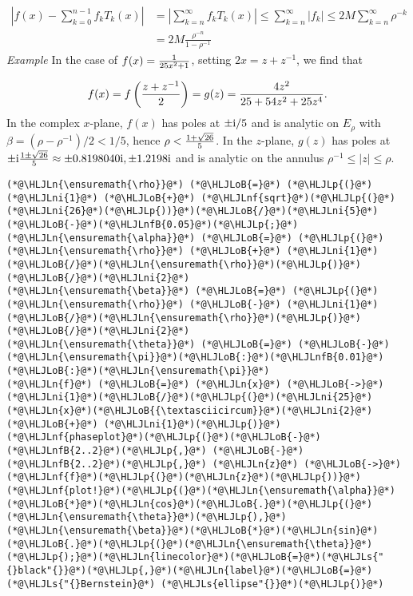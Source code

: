 \documentclass[12pt,a4paper]{article}
\newcommand{\HLJLn}[1]{#1}
\newcommand{\HLJLnf}[1]{\textcolor[RGB]{66,102,213}{#1}}
\newcommand{\HLJLs}[1]{\textcolor[RGB]{201,61,57}{#1}}
\newcommand{\HLJLnfB}[1]{\textcolor[RGB]{59,151,46}{#1}}
\newcommand{\HLJLni}[1]{\textcolor[RGB]{59,151,46}{#1}}
\newcommand{\HLJLoB}[1]{\textcolor[RGB]{102,102,102}{\textbf{#1}}}
\newcommand{\HLJLp}[1]{#1}
\def\I{ {\rm i} }
\begin{document}
\begin{align*}
\left \vert f(x) -   \sum_{k = 0}^{n-1}f_kT_k(x) \right\vert & = \left \vert  \sum_{k = n}^{\infty}f_kT_k(x) \right\vert \leq \sum_{k = n}^{\infty}\vert f_k \vert \leq 2M \sum_{k = n}^{\infty} \rho^{-k}\\
& = 2M \frac{\rho^{-n}}{1 - \rho^{-1}}
\end{align*}
\emph{Example}  In the case of $f(x) = {1 \over 25 x^2 + 1}$, setting $2x = z + z^{-1}$, we find that

\[
f(x) = f\left( {z+z^{-1} \over 2 } \right) = g(z) = {4 z^2 \over 25 + 54 z^2 + 25 z^4}.
\]
In the complex $x$-plane, $f(x)$ has poles at $\pm \I/5$ and is analytic on $E_{\rho}$ with $\beta = (\rho - \rho^{-1})/2 < 1/5$, hence $\rho < { 1 + \sqrt{26} \over 5 }$. In the $z$-plane, $g(z)$ has poles at $\pm \I { 1 \pm \sqrt{26} \over 5 } \approx \pm 0.8198040\I,\pm1.2198\I$ and is analytic on the annulus $\rho^{-1} \leq \vert z \vert \leq \rho$.


\begin{lstlisting}
(*@\HLJLn{\ensuremath{\rho}}@*) (*@\HLJLoB{=}@*) (*@\HLJLp{(}@*)(*@\HLJLni{1}@*) (*@\HLJLoB{+}@*) (*@\HLJLnf{sqrt}@*)(*@\HLJLp{(}@*)(*@\HLJLni{26}@*)(*@\HLJLp{))}@*)(*@\HLJLoB{/}@*)(*@\HLJLni{5}@*)(*@\HLJLoB{-}@*)(*@\HLJLnfB{0.05}@*)(*@\HLJLp{;}@*)
(*@\HLJLn{\ensuremath{\alpha}}@*) (*@\HLJLoB{=}@*) (*@\HLJLp{(}@*)(*@\HLJLn{\ensuremath{\rho}}@*) (*@\HLJLoB{+}@*) (*@\HLJLni{1}@*)(*@\HLJLoB{/}@*)(*@\HLJLn{\ensuremath{\rho}}@*)(*@\HLJLp{)}@*)(*@\HLJLoB{/}@*)(*@\HLJLni{2}@*)
(*@\HLJLn{\ensuremath{\beta}}@*) (*@\HLJLoB{=}@*) (*@\HLJLp{(}@*)(*@\HLJLn{\ensuremath{\rho}}@*) (*@\HLJLoB{-}@*) (*@\HLJLni{1}@*)(*@\HLJLoB{/}@*)(*@\HLJLn{\ensuremath{\rho}}@*)(*@\HLJLp{)}@*)(*@\HLJLoB{/}@*)(*@\HLJLni{2}@*)
(*@\HLJLn{\ensuremath{\theta}}@*) (*@\HLJLoB{=}@*) (*@\HLJLoB{-}@*)(*@\HLJLn{\ensuremath{\pi}}@*)(*@\HLJLoB{:}@*)(*@\HLJLnfB{0.01}@*)(*@\HLJLoB{:}@*)(*@\HLJLn{\ensuremath{\pi}}@*)
(*@\HLJLn{f}@*) (*@\HLJLoB{=}@*) (*@\HLJLn{x}@*) (*@\HLJLoB{->}@*) (*@\HLJLni{1}@*)(*@\HLJLoB{/}@*)(*@\HLJLp{(}@*)(*@\HLJLni{25}@*)(*@\HLJLn{x}@*)(*@\HLJLoB{{\textasciicircum}}@*)(*@\HLJLni{2}@*) (*@\HLJLoB{+}@*) (*@\HLJLni{1}@*)(*@\HLJLp{)}@*)
(*@\HLJLnf{phaseplot}@*)(*@\HLJLp{(}@*)(*@\HLJLoB{-}@*)(*@\HLJLnfB{2..2}@*)(*@\HLJLp{,}@*) (*@\HLJLoB{-}@*)(*@\HLJLnfB{2..2}@*)(*@\HLJLp{,}@*) (*@\HLJLn{z}@*) (*@\HLJLoB{->}@*) (*@\HLJLnf{f}@*)(*@\HLJLp{(}@*)(*@\HLJLn{z}@*)(*@\HLJLp{))}@*)
(*@\HLJLnf{plot!}@*)(*@\HLJLp{(}@*)(*@\HLJLn{\ensuremath{\alpha}}@*)(*@\HLJLoB{*}@*)(*@\HLJLn{cos}@*)(*@\HLJLoB{.}@*)(*@\HLJLp{(}@*)(*@\HLJLn{\ensuremath{\theta}}@*)(*@\HLJLp{),}@*)(*@\HLJLn{\ensuremath{\beta}}@*)(*@\HLJLoB{*}@*)(*@\HLJLn{sin}@*)(*@\HLJLoB{.}@*)(*@\HLJLp{(}@*)(*@\HLJLn{\ensuremath{\theta}}@*)(*@\HLJLp{);}@*)(*@\HLJLn{linecolor}@*)(*@\HLJLoB{=}@*)(*@\HLJLs{"{}black"{}}@*)(*@\HLJLp{,}@*)(*@\HLJLn{label}@*)(*@\HLJLoB{=}@*)(*@\HLJLs{"{}Bernstein}@*) (*@\HLJLs{ellipse"{}}@*)(*@\HLJLp{)}@*)
\end{lstlisting}
\end{document}

